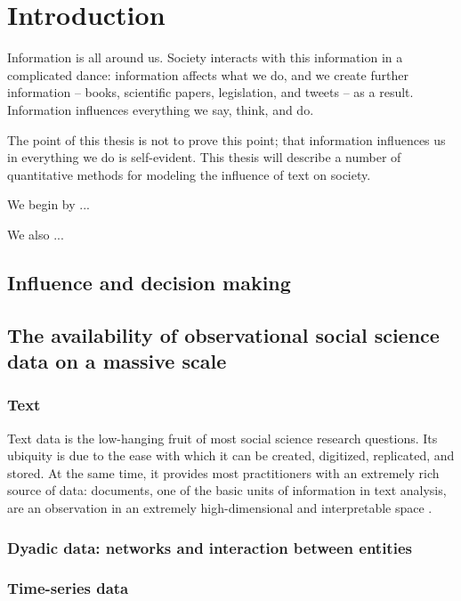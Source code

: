 \chapter{Introduction}


Information is all around us.  Society interacts with this information
in a complicated dance: information affects what we do, and we create
further information -- books, scientific papers, legislation, and
tweets -- as a result.  Information influences everything we say,
think, and do.

The point of this thesis is not to prove this point; that information
influences us in everything we do is self-evident.  This thesis will
describe a number of quantitative methods for modeling the influence of text on society.

We begin by ...

We also ...

\section{Influence and decision making}

\section{The availability of observational social science data on a massive scale}

\subsection{Text}
  Text data is the low-hanging fruit of most social science research
  questions.  Its ubiquity is due to the ease with which it can be
  created, digitized, replicated, and stored.  At the same time, it
  provides most practitioners with an extremely rich source of data:
  documents, one of the basic units of information in text analysis,
  are an observation in an extremely high-dimensional and
  interpretable space \cite{changrtl:2009}.


\subsection{Dyadic data: networks and interaction between entities}

\subsection{Time-series data}


